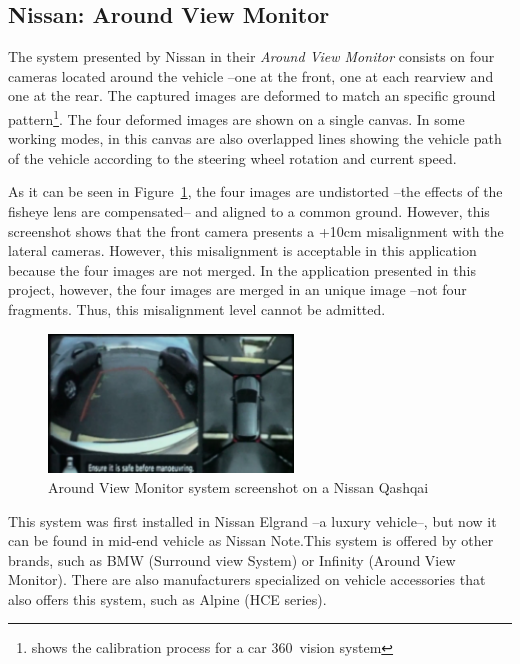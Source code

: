 \subsection{Nissan: Around View Monitor}\label{ssec:nissan_commerc_state}
The system presented by Nissan in their \emph{Around View Monitor} consists on four cameras located around the vehicle --one at the front, one at each rearview and one at the rear. The captured images are  deformed to match an specific ground pattern\footnote{\cite{calibration} shows the calibration process for a car 360\degree~vision system}. The four deformed images are shown on a single canvas. In some working modes, in this canvas are also overlapped lines showing the vehicle path of the vehicle according to the steering wheel rotation and current speed. \cite{totnissan}

As it can be seen in Figure~\ref{fig:nissan-state}, the four images are undistorted --the effects of the fisheye lens are compensated-- and aligned to a common ground. However, this screenshot shows that the front camera presents a +10cm misalignment with the lateral cameras. However, this misalignment is acceptable in this application because the four images are not merged. In the application presented in this project, however, the four images are merged in an unique image --not four fragments. Thus, this misalignment level cannot be admitted. 

\begin{figure}[h]
\center
\includegraphics[width=0.58\textwidth]{images/nissan-state}
		\caption{Around View Monitor system screenshot on a Nissan Qashqai \cite{videonissan}}
		\label{fig:nissan-state}
\end{figure}

This system was first installed in Nissan Elgrand --a luxury vehicle--, but now it can be found in mid-end vehicle as Nissan Note.This system is offered by other brands, such as BMW (Surround view System) or Infinity (Around View Monitor). There are also manufacturers specialized on vehicle accessories that also offers this system, such as Alpine (HCE series). \cite{infiniti} \cite{calibration}

